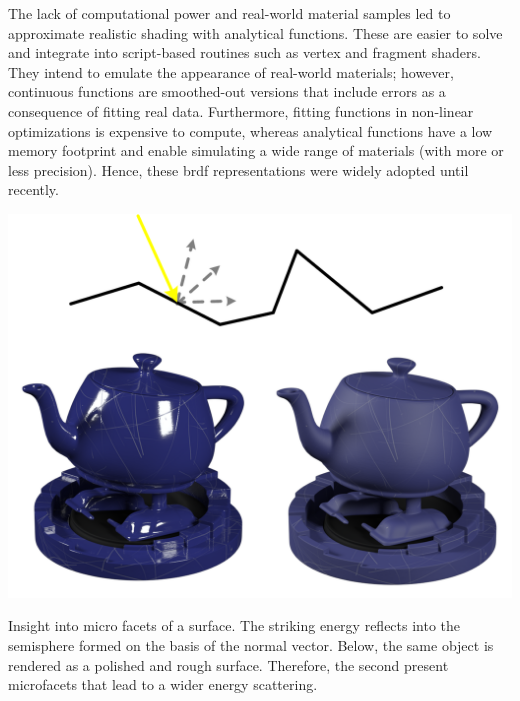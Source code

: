 The lack of computational power and real-world material samples led to approximate realistic shading with analytical functions. These are easier to solve and integrate into script-based routines such as vertex and fragment shaders. They intend to emulate the appearance of real-world materials; however, continuous functions are smoothed-out versions that include errors as a consequence of fitting real data. Furthermore, fitting functions in non-linear optimizations is expensive to compute, whereas analytical functions have a low memory footprint and enable simulating a wide range of materials (with more or less precision). Hence, these \acrshort{brdf} representations were widely adopted until recently. 

\begin{marginfigure}[3cm]
	\includegraphics{figs/fundamentals/microfacets.png}
	\caption{Insight into micro facets of a surface. The striking energy reflects into the semisphere formed on the basis of the normal vector. Below, the same object is rendered as a polished and rough surface. Therefore, the second present microfacets that lead to a wider energy scattering.}
	\label{fig:microfacets}
\end{marginfigure}

